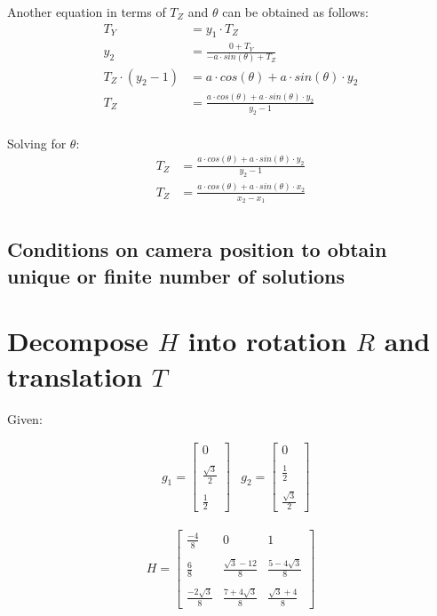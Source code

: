 \documentclass[12pt, oneside]{article}
\begin{document}
Another equation in terms of $T_Z$ and $\theta$ can be obtained as follows:
\begin{align*}
T_Y &= y_1 \cdot {T_Z}  \\
y_2 &= \frac{0 + T_Y}{-a \cdot sin(\theta) + T_Z} \\
T_Z \cdot (y_2 - 1) &= a \cdot cos(\theta) + a \cdot sin(\theta) \cdot y_2 \\
T_Z &= \frac{a \cdot cos(\theta) + a \cdot sin(\theta) \cdot y_2}{y_2 - 1} \\
\end{align*}

Solving for $\theta$:
\begin{align*}
T_Z &= \frac{a \cdot cos(\theta) + a \cdot sin(\theta) \cdot y_2}{y_2 - 1} \\
T_Z &= \frac{a \cdot cos(\theta) + a \cdot sin(\theta) \cdot x_2}{x_2 - x_1} \\
\end{align*}

\subsection{Conditions on camera position to obtain unique or finite number 
of solutions}

\clearpage
\section{Decompose $H$ into rotation $R$ and translation $T$}

Given:

\begin{align*}
    & g_1 =  
    \begin{bmatrix} 0 \\ \\ \frac{\sqrt{3}}{2} \\ \\ \frac{1}{2} \end{bmatrix} 
    & g_2 =  
    \begin{bmatrix} 0 \\ \\ \frac{1}{2} \\ \\ \frac{\sqrt{3}}{2} \end{bmatrix} 
\end{align*}

\begin{align*}
    H =  
    \begin{bmatrix} \frac{-4}{8} & 0 & 1 \\ \\ 
                    \frac{6}{8} & \frac{\sqrt{3} - 12}{8} 
                    & \frac{5 -4\sqrt{3}}{8}    \\ \\ 
                    \frac{-2 \sqrt{3}}{8} & 
                    \frac{7 + 4\sqrt{3}}{8} & \frac{\sqrt{3} + 4}{8} 
                \end{bmatrix} 
\end{align*}
\end{document}

